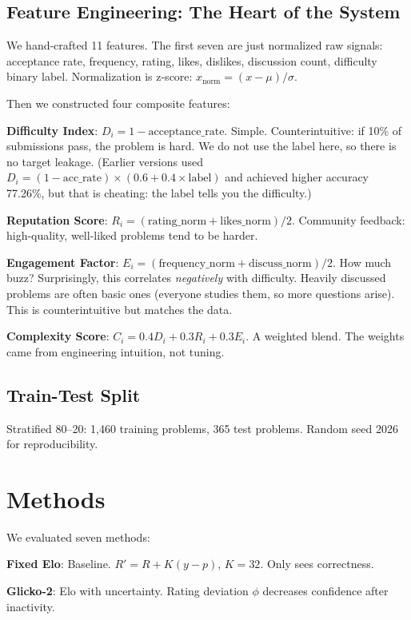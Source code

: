 \documentclass[conference]{IEEEtran}
\begin{document}
\subsection{Feature Engineering: The Heart of the System}

We hand-crafted 11 features. The first seven are just normalized raw signals: acceptance rate, frequency, rating, likes, dislikes, discussion count, difficulty binary label. Normalization is z-score: $x_{\text{norm}} = (x - \mu) / \sigma$.

Then we constructed four composite features:

\textbf{Difficulty Index}: $D_i = 1 - \text{acceptance\_rate}$. Simple. Counterintuitive: if 10\% of submissions pass, the problem is hard. We do not use the label here, so there is no target leakage. (Earlier versions used $D_i = (1 - \text{acc\_rate}) \times (0.6 + 0.4 \times \text{label})$ and achieved higher accuracy 77.26\%, but that is cheating: the label tells you the difficulty.)

\textbf{Reputation Score}: $R_i = (\text{rating\_norm} + \text{likes\_norm}) / 2$. Community feedback: high-quality, well-liked problems tend to be harder.

\textbf{Engagement Factor}: $E_i = (\text{frequency\_norm} + \text{discuss\_norm}) / 2$. How much buzz? Surprisingly, this correlates \emph{negatively} with difficulty. Heavily discussed problems are often basic ones (everyone studies them, so more questions arise). This is counterintuitive but matches the data.

\textbf{Complexity Score}: $C_i = 0.4 D_i + 0.3 R_i + 0.3 E_i$. A weighted blend. The weights came from engineering intuition, not tuning.

\subsection{Train-Test Split}

Stratified 80--20: 1,460 training problems, 365 test problems. Random seed 2026 for reproducibility.

\section{Methods}

We evaluated seven methods:

\textbf{Fixed Elo}: Baseline. $R' = R + K(y - p)$, $K = 32$. Only sees correctness.

\textbf{Glicko-2}: Elo with uncertainty. Rating deviation $\phi$ decreases confidence after inactivity.
\end{document}
